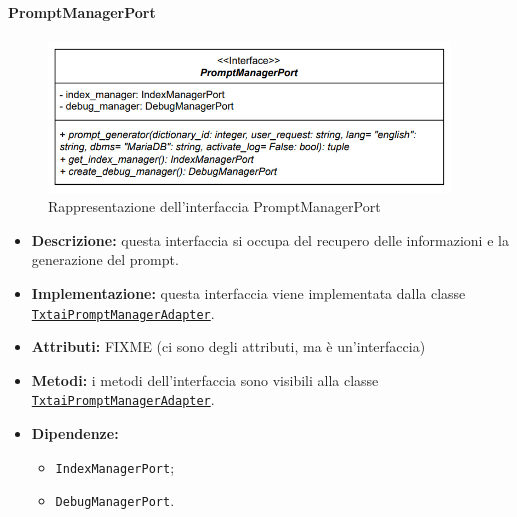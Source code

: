 \paragraph{PromptManagerPort} \label{PromptManagerPort}
\begin{figure}[H]
    \centering
    \includegraphics[width=0.95\textwidth]{assets/Backend/prompt_manager_port.png}
    \caption{Rappresentazione dell'interfaccia PromptManagerPort}
  \end{figure}
\begin{itemize}
    \item \textbf{Descrizione:} questa interfaccia si occupa del recupero delle informazioni e la generazione del prompt.
    \item \textbf{Implementazione:} questa interfaccia viene implementata dalla classe \hyperref[TxtaiPromptManagerAdapter]{\texttt{TxtaiPromptManagerAdapter}}. 
    \item \textbf{Attributi:} FIXME (ci sono degli attributi, ma è un'interfaccia)
    \item \textbf{Metodi:} i metodi dell'interfaccia sono visibili alla classe \hyperref[TxtaiPromptManagerAdapter]{\texttt{TxtaiPromptManagerAdapter}}.
    \item \textbf{Dipendenze:}
    \begin{itemize}
        \item \texttt{IndexManagerPort};
        \item \texttt{DebugManagerPort}.
    \end{itemize}
\end{itemize} 

